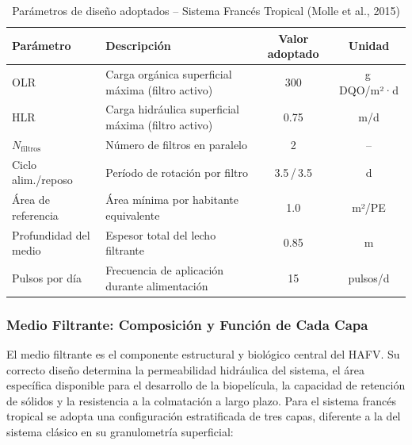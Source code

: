 \documentclass[12pt,a4paper]{article}
\begin{document}
\begin{table}[H]
\centering
\caption{Parámetros de diseño adoptados -- Sistema Francés Tropical (Molle et al., 2015)}
\label{tab:parametros_frances}
\begin{tabular}{p{5.0cm}p{5.2cm}cc}
\toprule
\textbf{Parámetro} & \textbf{Descripción} & \textbf{Valor adoptado} & \textbf{Unidad} \\
\midrule
OLR & Carga orgánica superficial máxima (filtro activo) & 300 & g\,DQO/m²·d \\
HLR & Carga hidráulica superficial máxima (filtro activo) & 0.75 & m/d \\
$N_\text{filtros}$ & Número de filtros en paralelo & 2 & -- \\
Ciclo alim./reposo & Período de rotación por filtro & 3.5\,/\,3.5 & d \\
Área de referencia & Área mínima por habitante equivalente & 1.0 & m²/PE \\
Profundidad del medio & Espesor total del lecho filtrante & 0.85 & m \\
Pulsos por día & Frecuencia de aplicación durante alimentación & 15 & pulsos/d \\
\bottomrule
\end{tabular}
\end{table}

\subsubsection*{Medio Filtrante: Composición y Función de Cada Capa}

El medio filtrante es el componente estructural y biológico central del HAFV. Su correcto diseño determina la permeabilidad hidráulica del sistema, el área específica disponible para el desarrollo de la biopelícula, la capacidad de retención de sólidos y la resistencia a la colmatación a largo plazo. Para el sistema francés tropical se adopta una configuración estratificada de tres capas, diferente a la del sistema clásico en su granulometría superficial:
\end{document}
